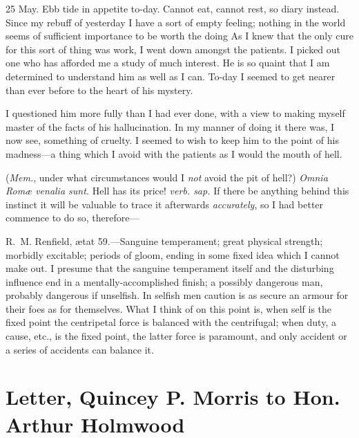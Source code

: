 \begin{diary}{25 May.}
Ebb tide in appetite to-day. Cannot eat, cannot rest, so diary instead. Since my rebuff of yesterday I have a sort of empty feeling; nothing in the world seems of sufficient importance to be worth the doing As I knew that the only cure for this sort of thing was work, I went down amongst the patients. I picked out one who has afforded me a study of much interest. He is so quaint that I am determined to understand him as well as I can. To-day I seemed to get nearer than ever before to the heart of his mystery.

I questioned him more fully than I had ever done, with a view to making myself master of the facts of his hallucination. In my manner of doing it there was, I now see, something of cruelty. I seemed to wish to keep him to the point of his madness—a thing which I avoid with the patients as I would the mouth of hell.

(\textit{Mem.}, under what circumstances would I \textit{not} avoid the pit of hell?) \textit{Omnia Romæ venalia sunt.} Hell has its price! \textit{verb. sap.} If there be anything behind this instinct it will be valuable to trace it afterwards \textit{accurately}, so I had better commence to do so, therefore—

R\@.~M\@. Renfield, ætat 59.—Sanguine temperament; great physical strength; morbidly excitable; periods of gloom, ending in some fixed idea which I cannot make out. I presume that the sanguine temperament itself and the disturbing influence end in a mentally-accomplished finish; a possibly dangerous man, probably dangerous if unselfish. In selfish men caution is as secure an armour for their foes as for themselves. What I think of on this point is, when self is the fixed point the centripetal force is balanced with the centrifugal; when duty, a cause, etc., is the fixed point, the latter force is paramount, and only accident or a series of accidents can balance it.
\end{diary}

\begin{a4}
	\clearpage
\end{a4}

\section{Letter, Quincey P\@. Morris to Hon. Arthur Holmwood}

